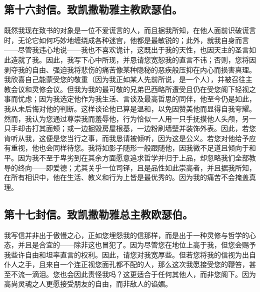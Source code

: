 
\subsection{第十六封信。致凯撒勒雅主教欧瑟伯。}

既然我现在致书的对象是一位不爱谎言的人，而且据我所知，在他人面前识破谎言时，无论它如何巧妙地缠绕成各种迷宫，他都是最敏锐的；此外，就我自身而言——尽管我违心地说——我也不喜欢诡计，这既出于我的天性，也因天主的圣言如此造就了我。因此，我写下心中所现，并恳请您宽恕我的直言不讳；否则，您将因剥夺我的自由、强迫我将悲伤的痛苦像某种隐秘的恶疾般压抑在内心而损害真理。我欣喜自己能蒙受您的敬重（因为我正如某人先前所说，是一个人），并被召往主教会议和灵修会议。但我为我的最可敬的兄弟巴西略所遭受且仍在受您阁下轻视之事而忧虑；因为我选定他作为我生活、言谈及最高哲思的同伴，他至今仍是如此，我从未后悔对他的判断。这样谈论他已算是温和，以免因赞美他而显得自我夸耀。然而，我认为您通过尊崇我而羞辱他，行为恰似一人用一只手抚摸他人头颅，另一只手却击打其面颊；或一边掘毁房屋根基，一边粉刷墙壁并装饰外表。因此，若您肯听从我，这便是您当行之事，而我恳请被倾听，因为这是公义。若您对他给予应有重视，他也会同样待您。我将如影子随形一般跟随他，因我微不足道且倾向于和平。因为我不至于卑劣到在其余方面愿意追求哲学并归于上品，却忽略我们全部教导的终向——即爱德；尤其关乎一位司铎，且是品性如此崇高者，并且据我所知，在所有相识中，他在生活、教义和行为上皆是最优秀的。因为我的痛苦不会掩盖真理。\par


\subsection{第十七封信。致凯撒勒雅总主教欧瑟伯。}

我写信并非出于傲慢之心，正如您埋怨我的信那样，而是出于一种灵修与哲学的心态，并且是合宜的——除非这也冒犯了。因为尽管您在地位上高于我，但您会赐予我些许自由和坦率直言的权利。因此，请您对我宽厚些。但若您将我的信视为出自仆人之手，且来自一个连正视您面孔都不配的人，那么这次我愿接受您的鞭笞，甚至不流一滴泪。您也会因此责怪我吗？这更适合于任何其他人，而非您阁下。因为高尚灵魂之人更愿接受朋友的自由，而非敌人的谄媚。\par


